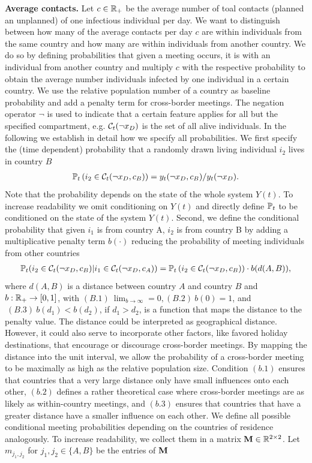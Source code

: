 \textbf{Average contacts.}
Let $c \in \mathbb{R}_+$ be the average number of toal contacts (planned an unplanned) of one infectious individual per day. We want to distinguish between how many of the average contacts per day $c$ are within individuals from the same country and how many are within individuals from another country. We do so by defining probabilities that given a meeting occurs, it is with an individual from another country and multiply $c$ with the respective probability to obtain the average number individuals infected by one individual in a certain country. We use the relative population number of a country as baseline probability and add a penalty term for cross-border meetings. The negation operator $\neg$ is used to indicate that a certain feature applies for all but the specified compartment, e.g. $\mathcal{C}_t(\neg x_D)$ is the set of all alive individuals. In the following we establish in detail how we specify all probabilities. We first specify the (time dependent) probability that a randomly drawn living individual $i_2$ lives in country $B$ 
\begin{align*}
\mathbb{P}_t\left(i_2 \in \mathcal{C}_t(\neg x_D, c_B)\right) =y_t(\neg x_D, c_B) / y_t(\neg x_D).
\end{align*}
Note that the probability depends on the state of the whole system $Y(t)$. To increase readability we omit conditioning on $Y(t)$ and directly define $\mathbb{P}_t$ to be conditioned on the state of the system $Y(t)$.  
Second, we define the conditional probability that given $i_1$ is from country A, $i_2$ is from country B by adding a multiplicative penalty term $b(\cdot)$ reducing the probability of meeting individuals from other countries 
\begin{align*}
\mathbb{P}_t(i_2 \in \mathcal{C}_t(\neg x_D, c_B) | i_1 \in \mathcal{C}_t(\neg x_D, c_A) ) = \mathbb{P}_t\left(i_2 \in \mathcal{C}_t(\neg x_D, c_B)\right) \cdot b(d(A, B)),
\end{align*}
where $d(A, B)$ is a distance between country $A$ and country $B$ and $b: \mathbb{R}_+ \to [0,1]$, with 
$(B.1) \ \lim_{b \to \infty} = 0, (B.2) \ b(0) = 1$, and $ \ (B.3) \ b(d_1) < b(d_2)$, if $d_1 > d_2$, is a function that maps the distance to the penalty value. The distance could be interpreted as geographical distance. However, it could also serve to incorporate other factors, like favored holiday destinations, that encourage or discourage cross-border meetings.  By mapping the distance into the unit interval, we allow the probability of a cross-border meeting to be maximally as high as the relative population size. Condition $(b.1)$ ensures that countries that a very large distance only have small influences onto each other, $(b.2)$ defines a rather theoretical case where cross-border meetings are as likely as within-country meetings, and $(b.3)$ ensures that countries that have a greater distance have a smaller influence on each other.      We define all possible conditional meeting probabilities depending on the countries of residence analogously. To increase readability, we collect them in a matrix $\mathbf{M} \in \mathbb{R}^{2 \times 2}$. Let $m_{j_1,j_2}$ for $j_1, j_2 \in \{A, B\}$ be the entries of $\mathbf{M}$
